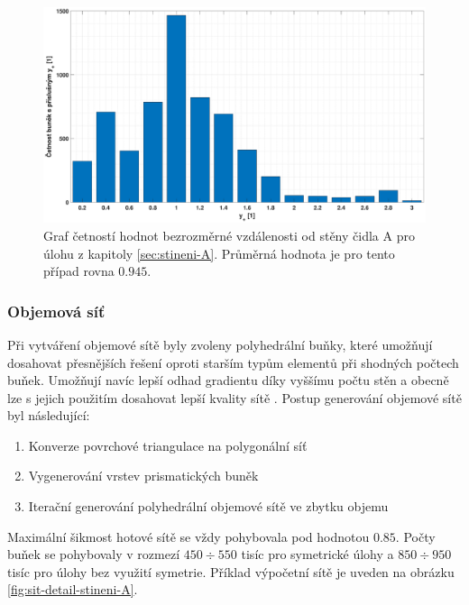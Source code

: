             \begin{figure}[ht!]
                \centering
                \includegraphics*[width=\textwidth, trim={5.0cm 1.0cm 5.8cm 2.0cm}]{300_VYPOCETNI_MODEL/yplus-stineni-A.eps}
                \caption{Graf četností hodnot bezrozměrné vzdálenosti od stěny čidla A pro úlohu z kapitoly \ref{sec:stineni-A}. Průměrná hodnota je pro tento případ rovna $0.945$.}
                \label{fig:yplus-stineni-A}
            \end{figure}

            \newpage


        \subsubsection{Objemová síť}

        Při vytváření objemové sítě byly zvoleny polyhedrální buňky, které umožňují dosahovat přesnějších řešení oproti starším typům elementů při shodných počtech buňek. Umožňují navíc lepší odhad gradientu díky vyššímu počtu stěn a obecně lze s jejich použitím dosahovat lepší kvality sítě \cite{Sosnowski2018}. Postup generování objemové sítě byl následující:

        \begin{enumerate}
            \item Konverze povrchové triangulace na polygonální síť
            \item Vygenerování vrstev prismatických buněk
            \item Iterační generování polyhedrální objemové sítě ve zbytku objemu
        \end{enumerate}

        Maximální šikmost hotové sítě se vždy pohybovala pod hodnotou $0.85$. Počty buňek se pohybovaly v rozmezí $450 \div 550$ tisíc pro symetrické úlohy a $850 \div 950$ tisíc pro úlohy bez využití symetrie. Příklad výpočetní sítě je uveden na obrázku \ref{fig:sit-detail-stineni-A}.

